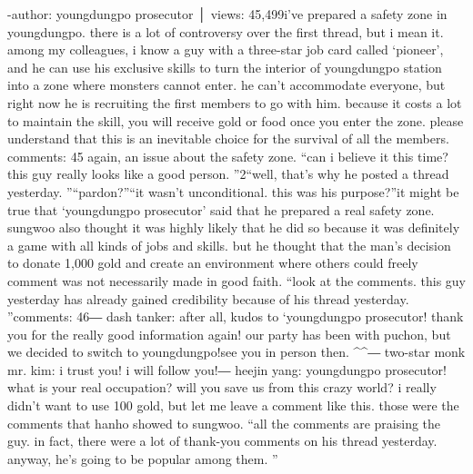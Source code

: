 -author: youngdungpo prosecutor │ views: 45,499i’ve prepared a safety zone in youngdungpo.
 there is a lot of controversy over the first thread, but i mean it.
 among my colleagues, i know a guy with a three-star job card called ‘pioneer’, and he can use his exclusive skills to turn the interior of youngdungpo station into a zone where monsters cannot enter.
 he can’t accommodate everyone, but right now he is recruiting the first members to go with him.
 because it costs a lot to maintain the skill, you will receive gold or food once you enter the zone.
 please understand that this is an inevitable choice for the survival of all the members.
comments: 45 again, an issue about the safety zone.
“can i believe it this time? this guy really looks like a good person.
”2“well, that’s why he posted a thread yesterday.
”“pardon?”“it wasn’t unconditional.
 this was his purpose?”it might be true that ‘youngdungpo prosecutor’ said that he prepared a real safety zone.
sungwoo also thought it was highly likely that he did so because it was definitely a game with all kinds of jobs and skills.
 but he thought that the man’s decision to donate 1,000 gold and create an environment where others could freely comment was not necessarily made in good faith.
“look at the comments.
 this guy yesterday has already gained credibility because of his thread yesterday.
”comments: 46― dash tanker: after all, kudos to ‘youngdungpo prosecutor! thank you for the really good information again! our party has been with puchon, but we decided to switch to youngdungpo!see you in person then.
^^― two-star monk mr.
 kim: i trust you! i will follow you!― heejin yang: youngdungpo prosecutor! what is your real occupation? will you save us from this crazy world? i really didn’t want to use 100 gold, but let me leave a comment like this.
those were the comments that hanho showed to sungwoo.
“all the comments are praising the guy.
 in fact, there were a lot of thank-you comments on his thread yesterday.
 anyway, he’s going to be popular among them.
”

 